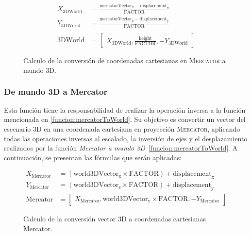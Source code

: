 \documentclass[a4paper, 11pt]{book}
\begin{document}
\begin{figure}[h]
    \begin{align*}
    X_{\text{3DWorld}} &= \frac{\mathbf{\mathrm{mercatorVector}}_{\text{x}} - \mathbf{\mathrm{displacement}}_{\text{x}}}{\mathbf{\mathrm{FACTOR}}} \\
    Y_{\text{3DWorld}} &= \frac{\mathbf{\mathrm{mercatorVector}}_{\text{z}} - \mathbf{\mathrm{displacement}}_{\text{y}}}{\mathbf{\mathrm{FACTOR}}} \\\\
    \mathbf{\mathrm{3DWorld}} &= 
    \begin{bmatrix}
    X_{\text{3DWorld}}, \frac{\mathrm{height}}{\mathbf{\mathrm{FACTOR}}}, -Y_{\text{3DWorld}}
    \end{bmatrix}
    \end{align*}
\caption{Calculo de la conversión de coordenadas cartesianas en \textsc{Mercator} a mundo \textsc{3D}.}
  \label{formula:mercatorToWorld}
\end{figure}

\subsubsection{De mundo 3D a Mercator}
\label{funcion:worldtoMercator}
Esta función tiene la responsabilidad de realizar la operación inversa a la función mencionada en \ref{funcion:mercatorToWorld}. Su objetivo es convertir un vector del escenario 3D en una coordenada cartesiana en proyección \textsc{Mercator}, aplicando todas las operaciones inversas al escalado, la inversión de ejes y el desplazamiento realizados por la función \emph{Mercator a mundo 3D}~\ref{funcion:mercatorToWorld}. A continuación, se presentan las fórmulas que serán aplicadas:

\begin{figure}[h]
\begin{align*}
X_{\text{Mercator}} &= (\mathbf{\mathrm{world3DVector}}_{\text{x}} \times \mathbf{\mathrm{FACTOR}}) + \mathbf{\mathrm{displacement}}_{\text{x}} \\
Y_{\text{Mercator}} &= (\mathbf{\mathrm{world3DVector}}_{\text{z}} \times \mathbf{\mathrm{FACTOR}}) + \mathbf{\mathrm{displacement}}_{\text{y}} \\
\mathbf{\mathrm{Mercator}} &= 
\begin{bmatrix}
X_{\text{Mercator}}, \mathbf{\mathrm{world3DVector}}_{\text{y}} \times \mathbf{\mathrm{FACTOR}}, -Y_{\text{Mercator}}
\end{bmatrix}
\end{align*}
\caption{Calculo de la conversión vector 3D a coordenadas cartesianas Mercator.}
  \label{formula:worldtoMercator}
\end{figure}
\end{document}
